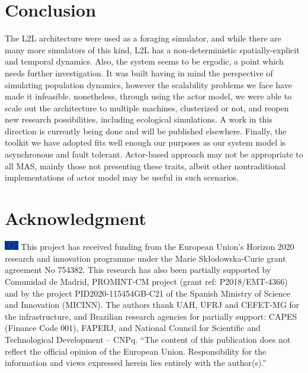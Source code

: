 \documentclass[runningheads]{llncs}
\begin{document}
\section{Conclusion}
\label{sec:conclusion}
The L2L architecture were used as a foraging simulator, and while there are many more simulators of this kind, L2L has a non-deterministic spatially-explicit and temporal dynamics. Also, the system seems to be ergodic, a point which needs further investigation. It was built having in mind the perspective of simulating population dynamics, however the scalability problems we face have made it infeasible. nonetheless, through using the actor model, we were able to scale out the architecture to multiple machines, clusterized or not, and reopen new research possibilities, including ecological simulations. A work in this direction is currently being done and will be published elsewhere. Finally, the toolkit we have adopted fits well enough our purposes as our system model is asynchronous and fault tolerant. Actor-based approach may not be appropriate to all MAS, mainly those not presenting these traits, albeit other nontraditional implementations of actor model may be useful in such scenarios.


\section*{Acknowledgment}

\noindent \includegraphics[width=0.6cm]{bandeira.png} This project has received funding from the European Union’s Horizon 2020 research and innovation programme under the Marie Skłodowska-Curie grant agreement No 754382. This research has also been partially supported by Comunidad de Madrid, PROMINT-CM project (grant ref: P2018/EMT-4366) and by the project PID2020-115454GB-C21 of the Spanish Ministry of Science and Innovation (MICINN). The authors thank UAH, UFRJ and CEFET-MG for the infrastructure, and Brazilian research agencies for partially support: CAPES (Finance Code 001), FAPERJ, and National Council for Scientific and Technological Development – CNPq. ``The content of this publication does not reflect the official opinion of the European Union. Responsibility for the information and views expressed herein lies entirely with the author(s).''


\FloatBarrier


%

%
%
%


%
\end{document}
